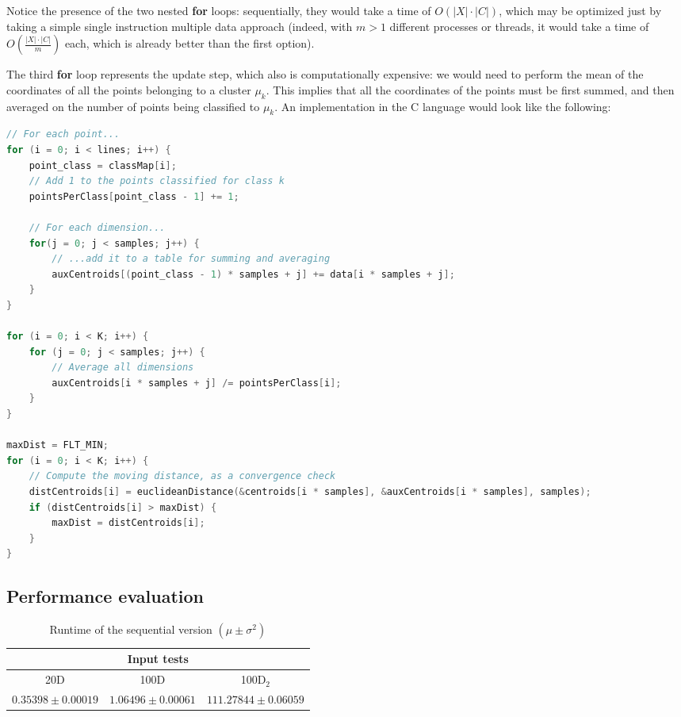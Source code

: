 \documentclass[11pt, journal]{IEEEtran}
\newcommand{\nwl}{

\vspace{11pt}

}
\begin{document}
Notice the presence of the two nested \textbf{for} loops: sequentially, they would take a time of $O(|X| \cdot |C|)$, which may be optimized just by taking a simple single instruction multiple data approach (indeed, with $m > 1$ different processes or threads, it would take a time of $O\left(\frac{|X| \cdot |C|}{m}\right)$ each, which is already better than the first option).
\nwl
The third \textbf{for} loop represents the update step, which also is computationally expensive: we would need to perform the mean of the coordinates of all the points belonging to a cluster $\mu_k$. This implies that all the coordinates of the points must be first summed, and then averaged on the number of points being classified to $\mu_k$. An implementation in the C language would look like the following:
\nwl
\begin{lstlisting}[language = C]
// For each point...
for (i = 0; i < lines; i++) {
    point_class = classMap[i];
    // Add 1 to the points classified for class k
    pointsPerClass[point_class - 1] += 1;

    // For each dimension...
    for(j = 0; j < samples; j++) {
        // ...add it to a table for summing and averaging
        auxCentroids[(point_class - 1) * samples + j] += data[i * samples + j];
    }
}

for (i = 0; i < K; i++) {
    for (j = 0; j < samples; j++) {
        // Average all dimensions
        auxCentroids[i * samples + j] /= pointsPerClass[i];
    }
}

maxDist = FLT_MIN;
for (i = 0; i < K; i++) {
    // Compute the moving distance, as a convergence check
    distCentroids[i] = euclideanDistance(&centroids[i * samples], &auxCentroids[i * samples], samples);
    if (distCentroids[i] > maxDist) {
        maxDist = distCentroids[i];
    }
}\end{lstlisting}

\subsection{Performance evaluation}

\begin{table}
    \label{seq_times}
    \centering
    \caption{Runtime of the sequential version $\left(\mu \pm \sigma^2\right)$}
    \renewcommand{\arraystretch}{1.3}
    \begin{tabular}{|c|c|c|}
        \hline
        \multicolumn{3}{|c|}{\textbf{Input tests}} \\
        \hline\hline
        20D & 100D & 100D$_2$ \\
        \hline
        $0.35398 \pm 0.00019$ & $1.06496 \pm 0.00061$ & $111.27844 \pm 0.06059$ \\
        \hline
    \end{tabular}
\end{table}
\end{document}
